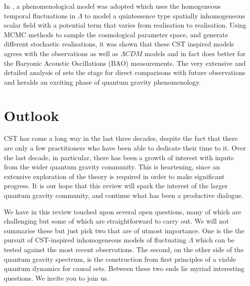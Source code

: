 In \cite{recentlambda}, a phenomenological model was adopted which uses the homogeneous temporal fluctuations in $\Lambda$ to model a  quintessence type spatially inhomogeneous scalar field with a potential term
that varies   from realisation to realisation. Using MCMC methods to sample  the cosmological parameter space, and
generate different stochastic realisations, it was shown  that  these CST inspired models agrees
with the observations as well as $\Lambda CDM$ models and in fact does better for the   Baryonic Acoustic Oscillations (BAO)
measurements.  The very extensive and detailed analysis of \cite{recentlambda} sets the stage for direct comparisons
with future observations and heralds an exciting phase of  quantum gravity phenomenology.  





\section{Outlook} 
\label{sec:outlook}

CST has come a long way in the last three decades, despite the fact that there are only a few  practitioners who have been able
to dedicate their time to it. Over the last
decade, in particular, there has been a growth of interest with inputs from the wider quantum gravity community. 
This is  heartening, since an  extensive exploration of the theory is required in order to make significant progress. It
is our hope  that this review will spark the interest of the larger quantum gravity  community, and continue what has
been a productive dialogue. 

We have in this review touched upon several open questions, many  of which are challenging but some of which are
straightforward to carry out. We will not summarise these but just pick two that are of utmost importance. One is the
the pursuit of CST-inspired inhomogeneous models of fluctuating $\Lambda$ which can be tested against the most recent observations. The second, on the other side of the quantum gravity spectrum, is the construction from first
principles of a viable quantum dynamics for causal sets. Between these two ends lie myriad interesting
questions. We invite you to join us.   


